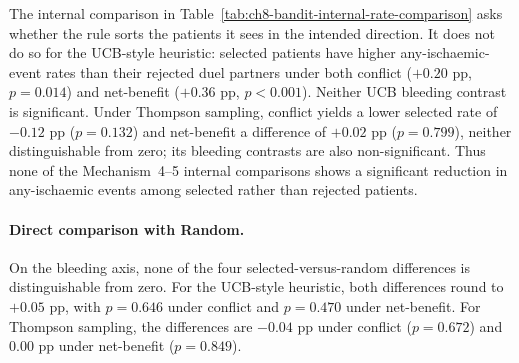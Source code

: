The internal comparison in Table~\ref{tab:ch8-bandit-internal-rate-comparison} asks whether
the rule sorts the patients it sees in the intended direction. It does not do so for the
UCB-style heuristic: selected patients have higher any-ischaemic-event rates than their
rejected duel partners under both conflict ($+0.20$ pp, $p=0.014$) and net-benefit
($+0.36$ pp, $p<0.001$). Neither UCB bleeding contrast is significant. Under Thompson
sampling, conflict yields a lower selected rate of $-0.12$ pp ($p=0.132$) and net-benefit
a difference of $+0.02$ pp ($p=0.799$), neither distinguishable from zero; its bleeding
contrasts are also non-significant. Thus none of the Mechanism~4--5 internal comparisons
shows a significant reduction in any-ischaemic events among selected rather than rejected
patients.

\vspace{10pt}

\paragraph{Direct comparison with Random.}

\begin{table}[htbp]
    \centering
    \small
    \setlength{\tabcolsep}{4pt}
    
    \caption{Bleeding and any-ischaemic-event rates among patients selected by the
    guided bandit and among the matched coin-flip random baseline, by policy and score
    regime, averaged over 100 seeded replications of 1,789 post-seed selected patients
    against 1,789 post-seed random-baseline patients drawn from the same arriving pairs
    within each run. The common 1,000-patient seed is excluded from both groups. Seed
    cohorts and arrival orders vary across runs, and the hyperparameters are retuned on
    each run's seed cohort.
    An ischaemic event denotes the occurrence of at least one of death, MI or stroke,
    with each patient counted once. Diff.\ is the selected-minus-random difference; SEM
    is the standard error of the paired per-run differences; $p$ is from a
    paired two-sided Wilcoxon signed-rank test on the per-replication
    selected-minus-random difference, the non-parametric counterpart that does not
    assume the difference is normally distributed.}
    \label{tab:ch8-bandit-rate-comparison}
\end{table}

On the bleeding axis, none of the four selected-versus-random differences is
distinguishable from zero. For the UCB-style heuristic, both differences round to
$+0.05$ pp, with $p=0.646$ under conflict and $p=0.470$ under net-benefit. For Thompson
sampling, the differences are $-0.04$ pp under conflict ($p=0.672$) and $0.00$ pp under
net-benefit ($p=0.849$).

